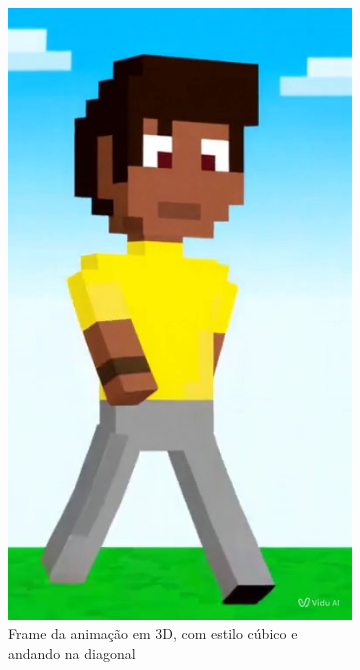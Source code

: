 \begin{figure}[htbp]
    \centering
    \caption{\small Comparação do resultado 3D e 2D gerado pelo Vidu}
    \label{fig:viduComparaDimensao}
    \begin{subfigure}{0.45\linewidth}
        \centering
        \includegraphics[width=0.8\linewidth]{figs/vidu/frame2.jpg}
        \caption{\small Frame da animação em 3D, com estilo cúbico e andando na diagonal}
        \label{fig:viduFrame3D}
    \end{subfigure}
    \begin{subfigure}{0.45\linewidth}
        \centering

\end{subfigure}
\end{figure}
